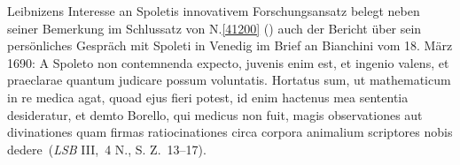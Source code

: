 \begin{ledgroup}
\pend
\pstart
Leibnizens Interesse an Spoletis innovativem Forschungsansatz belegt neben seiner Bemerkung im Schlussatz von N.\;\ref{41200} ()
auch der Bericht über sein persönliches Gespräch mit Spoleti 
in Venedig
im \cite{02135}Brief an Bianchini vom 18. März 1690:
\glqq A Spoleto non contemnenda expecto, juvenis enim est, et ingenio valens, et praeclarae quantum judicare possum voluntatis. Hortatus sum, ut mathematicum in re medica agat, quoad ejus fieri potest, id enim hactenus mea sententia desideratur, et demto Borello, qui medicus non fuit, magis observationes aut divinationes quam firmas ratiocinationes circa corpora animalium scriptores nobis dedere\grqq\ 
(\cite{02135}\textit{LSB} III,~4 N., S. Z.~13--17).
\pend
\end{ledgroup}
